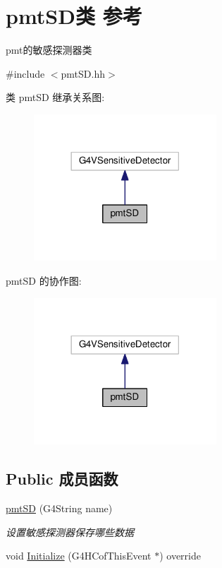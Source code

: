 \hypertarget{classpmtSD}{}\section{pmt\+S\+D类 参考}
\label{classpmtSD}


pmt的敏感探测器类  




{\ttfamily \#include $<$pmt\+S\+D.\+hh$>$}



类 pmt\+SD 继承关系图\+:\nopagebreak
\begin{figure}[H]
\begin{center}
\leavevmode
\includegraphics[width=194pt]{classpmtSD__inherit__graph}
\end{center}
\end{figure}


pmt\+SD 的协作图\+:\nopagebreak
\begin{figure}[H]
\begin{center}
\leavevmode
\includegraphics[width=194pt]{classpmtSD__coll__graph}
\end{center}
\end{figure}
\subsection*{Public 成员函数}
\begin{DoxyCompactItemize}
\item 
\hyperlink{classpmtSD_ae7746efb08ea75673a718fd342d243ea}{pmt\+SD} (G4\+String name)
\begin{DoxyCompactList}\small\item\em 设置敏感探测器保存哪些数据 \end{DoxyCompactList}\item 
void \hyperlink{classpmtSD_a5241646bdc0f46e27b011bf4fa35dc07}{Initialize} (G4\+H\+Cof\+This\+Event $\ast$) override
\end{DoxyCompactItemize}
